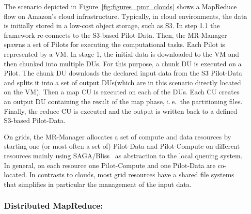 \documentclass[times]{cpeauth}
\newcommand{\pilot}{Pilot\xspace}
\newcommand{\pilots}{Pilots\xspace}
\newcommand{\pilotcompute}{Pilot-Compute\xspace}
\newcommand{\pilotdata}{Pilot-Data\xspace}
\newcommand{\mrmg}{MR-Manager\xspace}
\newcommand{\du}{DU\xspace}
\newcommand{\dus}{DUs\xspace}
\newcommand{\cu}{CU\xspace}
\begin{document}
The scenario depicted in Figure~\ref{fig:figures_pmr_clouds} shows a MapReduce
flow on Amazon's cloud infrastructure. Typically, in cloud environments, the
data is initially stored in a low-cost object storage, such as S3. In step 1.1
the framework re-connects to the S3-based \pilotdata. Then, the \mrmg spawns a
set of \pilots for executing the computational tasks. Each \pilot is
represented by a VM. In stage 1, the initial data is downloaded to the VM and
then chunked into multiple \dus. For this purpose, a chunk \du is executed on
a \pilot. The chunk \du downloads the declared input data from the S3
\pilotdata and splits it into a set of output \dus (which are in this scenario
directly located on the VM). Then a map \cu is executed on each of the \dus.
Each \cu creates an output \du containing the result of the map phase, i.\,e.\
the partitioning files. Finally, the reduce \cu is executed and the output is
written back to a defined S3-based \pilotdata.


On grids, the \mrmg allocates a set of compute and data resources by starting
one (or most often a set of) \pilotdata and \pilotcompute on different
resources mainly using SAGA/Bliss~\cite{saga-bliss-pd} as abstraction to the
local queuing system. In general, on each resource one \pilotcompute and one
\pilotdata are co-located. In contrasts to clouds, most grid resources have a
shared file systems that simplifies in particular the management of the input
data.




\subsubsection*{Distributed MapReduce:}
\end{document}
